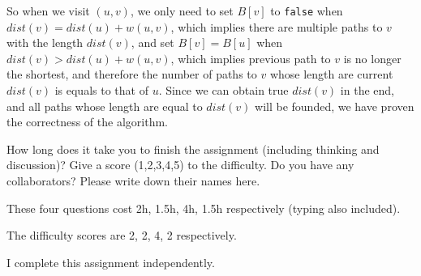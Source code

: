 \documentclass{oxmathproblems}
\begin{document}
\begin{questions}
\begin{Solution}
So when we visit $(u, v)$, we only need to set $B[v]$ to \texttt{false} when $dist(v)=dist(u)+w(u, v)$, which implies there are multiple paths to $v$ with the length $dist(v)$, and set $B[v]=B[u]$ when $dist(v)>dist(u)+w(u, v)$, which implies previous path to $v$ is no longer the shortest, and therefore the number of paths to $v$ whose length are current $dist(v)$ is equals to that of $u$. Since we can obtain true $dist(v)$ in the end, and all paths whose length are equal to $dist(v)$ will be founded, we have proven the correctness of the algorithm.
\end{Solution}

\vspace {2cm} 
\miquestion
How long does it take you to finish the assignment (including thinking and discussion)?
Give a score (1,2,3,4,5) to the difficulty.
Do you have any collaborators?
Please write down their names here.

\begin{Solution}

These four questions cost 2h, 1.5h, 4h, 1.5h respectively (typing also included).

The difficulty scores are 2, 2, 4, 2 respectively.

I complete this assignment independently.
\end{Solution}
\end{questions}
\end{document}
